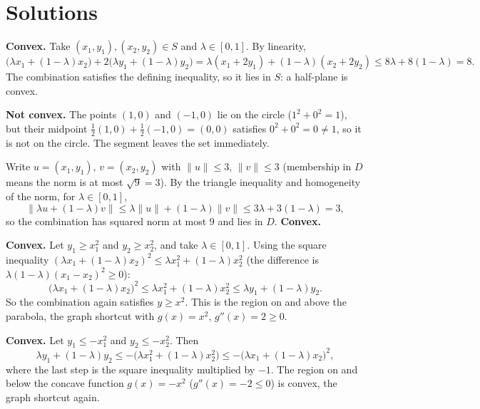\section{Solutions}

\begin{solutions}
  \item \textbf{Convex.} Take $(x_{1},y_{1}),(x_{2},y_{2})\in S$ and
        $\lambda\in[0,1]$. By linearity,
        \[
          \bigl(\lambda x_{1}+(1-\lambda)x_{2}\bigr)
          +2\bigl(\lambda y_{1}+(1-\lambda)y_{2}\bigr)
          =\lambda(x_{1}+2y_{1})+(1-\lambda)(x_{2}+2y_{2})
          \le 8\lambda+8(1-\lambda)=8 .
        \]
        The combination satisfies the defining inequality, so it lies in
        $S$: a half-plane is convex.

  \item \textbf{Not convex.} The points $(1,0)$ and $(-1,0)$ lie on the
        circle ($1^{2}+0^{2}=1$), but their midpoint
        $\tfrac12(1,0)+\tfrac12(-1,0)=(0,0)$ satisfies $0^{2}+0^{2}=0\neq
        1$, so it is not on the circle. The segment leaves the set
        immediately.

  \item Write $u=(x_{1},y_{1})$, $v=(x_{2},y_{2})$ with $\|u\|\le 3$,
        $\|v\|\le 3$ (membership in $D$ means the norm is at most
        $\sqrt{9}=3$). By the triangle inequality and homogeneity of the
        norm, for $\lambda\in[0,1]$,
        \[
          \|\lambda u+(1-\lambda)v\|
          \le \lambda\|u\|+(1-\lambda)\|v\|
          \le 3\lambda+3(1-\lambda)=3 ,
        \]
        so the combination has squared norm at most $9$ and lies in $D$.
        \textbf{Convex.}

  \item \textbf{Convex.} Let $y_{1}\ge x_{1}^{2}$ and $y_{2}\ge x_{2}^{2}$,
        and take $\lambda\in[0,1]$. Using the square inequality
        $(\lambda x_{1}+(1-\lambda)x_{2})^{2}\le\lambda
        x_{1}^{2}+(1-\lambda)x_{2}^{2}$ (the difference is
        $\lambda(1-\lambda)(x_{1}-x_{2})^{2}\ge 0$):
        \[
          \bigl(\lambda x_{1}+(1-\lambda)x_{2}\bigr)^{2}
          \le \lambda x_{1}^{2}+(1-\lambda)x_{2}^{2}
          \le \lambda y_{1}+(1-\lambda)y_{2} .
        \]
        So the combination again satisfies $y\ge x^{2}$. This is the region
        on and above the parabola, the graph shortcut with
        $g(x)=x^{2}$, $g''(x)=2\ge 0$.

  \item \textbf{Convex.} Let $y_{1}\le -x_{1}^{2}$ and $y_{2}\le
        -x_{2}^{2}$. Then
        \[
          \lambda y_{1}+(1-\lambda)y_{2}
          \le -\bigl(\lambda x_{1}^{2}+(1-\lambda)x_{2}^{2}\bigr)
          \le -\bigl(\lambda x_{1}+(1-\lambda)x_{2}\bigr)^{2},
        \]
        where the last step is the square inequality multiplied by $-1$.
        The region on and below the concave function $g(x)=-x^{2}$
        ($g''(x)=-2\le 0$) is convex, the graph shortcut again.


\end{solutions}
